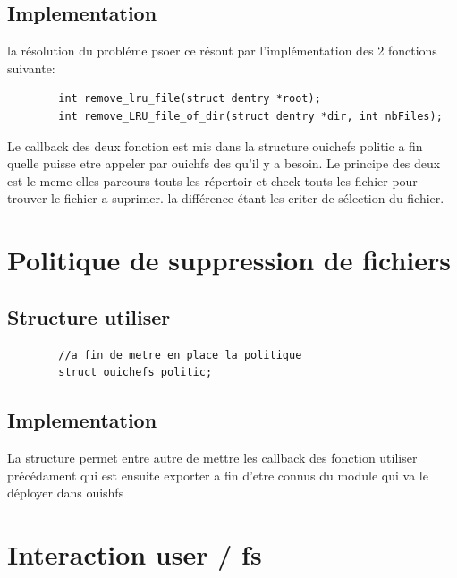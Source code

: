 \documentclass{article}
\begin{document}
	\subsection{Implementation}
	la résolution du probléme psoer ce résout par l'implémentation des 2 fonctions suivante:
	\begin{lstlisting}
		int remove_lru_file(struct dentry *root);
		int remove_LRU_file_of_dir(struct dentry *dir, int nbFiles);
	\end{lstlisting}
	Le callback des deux fonction est mis dans la structure ouichefs politic a fin quelle puisse etre appeler
	par ouichfs des qu'il y a besoin.
	\newline
	Le principe des deux est le meme elles parcours touts les répertoir et check touts les fichier pour trouver le fichier a suprimer.
	la différence étant les criter de sélection du fichier.	
	\section{Politique de suppression de fichiers}
	\subsection{Structure utiliser}
	\begin{lstlisting}
		//a fin de metre en place la politique
		struct ouichefs_politic;
	\end{lstlisting}
	\subsection{Implementation}
	La structure permet entre autre de mettre les callback des fonction utiliser précédament
	qui est ensuite exporter a fin d'etre connus du module qui va le déployer dans ouishfs
	\section{Interaction user / fs}
		
\end{document}
